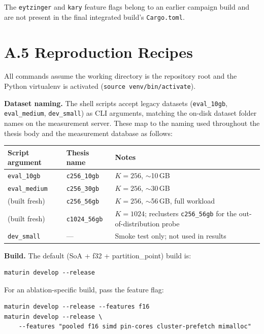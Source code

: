 \vspace{0.5em}
\noindent The \texttt{eytzinger} and \texttt{kary} feature flags belong to an earlier campaign build and are not present in the final integrated build's \texttt{Cargo.toml}.

\section*{A.5 Reproduction Recipes}

All commands assume the working directory is the repository root and the Python virtualenv is activated (\texttt{source venv/bin/activate}).

\textbf{Dataset naming.} The shell scripts accept legacy datasets (\texttt{eval\_10gb}, \texttt{eval\_medium}, \texttt{dev\_small}) as CLI arguments, matching the on-disk dataset folder names on the measurement server. These map to the naming used throughout the thesis body and the measurement database as follows:

\footnotesize
\begin{tabular}{ll>{\raggedright\arraybackslash}p{5cm}}
  \toprule
  Script argument & Thesis name & Notes \\
  \midrule
  \texttt{eval\_10gb}   & \texttt{c256\_10gb}  & $K=256$, $\sim$10\,GB \\
  \texttt{eval\_medium} & \texttt{c256\_30gb}  & $K=256$, $\sim$30\,GB \\
  (built fresh)         & \texttt{c256\_56gb}  & $K=256$, $\sim$56\,GB, full workload \\
  (built fresh)         & \texttt{c1024\_56gb} & $K=1024$; reclusters \texttt{c256\_56gb} for the out-of-distribution probe \\
  \texttt{dev\_small}   & ---                  & Smoke test only; not used in results \\
  \bottomrule
\end{tabular}

\vspace{0.5em}

\textbf{Build.} The default (SoA + f32 + partition\_point) build is:
\begin{verbatim}
maturin develop --release
\end{verbatim}

For an ablation-specific build, pass the feature flag:
\begin{verbatim}
maturin develop --release --features f16
maturin develop --release \
    --features "pooled f16 simd pin-cores cluster-prefetch mimalloc"
\end{verbatim}

